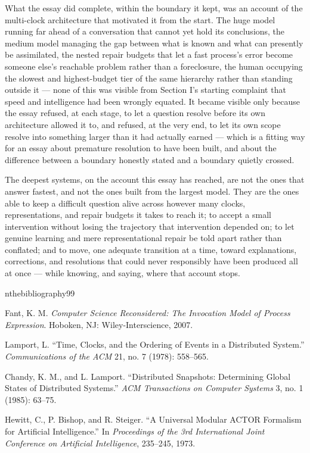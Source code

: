 \documentclass[11pt]{article}
\begin{document}
What the essay did complete, within the boundary it kept, was an account of the multi-clock architecture that motivated it from the start. The huge model running far ahead of a conversation that cannot yet hold its conclusions, the medium model managing the gap between what is known and what can presently be assimilated, the nested repair budgets that let a fast process's error become someone else's reachable problem rather than a foreclosure, the human occupying the slowest and highest-budget tier of the same hierarchy rather than standing outside it --- none of this was visible from Section I's starting complaint that speed and intelligence had been wrongly equated. It became visible only because the essay refused, at each stage, to let a question resolve before its own architecture allowed it to, and refused, at the very end, to let its own scope resolve into something larger than it had actually earned --- which is a fitting way for an essay about premature resolution to have been built, and about the difference between a boundary honestly stated and a boundary quietly crossed.

The deepest systems, on the account this essay has reached, are not the ones that answer fastest, and not the ones built from the largest model. They are the ones able to keep a difficult question alive across however many clocks, representations, and repair budgets it takes to reach it; to accept a small intervention without losing the trajectory that intervention depended on; to let genuine learning and mere representational repair be told apart rather than conflated; and to move, one adequate transition at a time, toward explanations, corrections, and resolutions that could never responsibly have been produced all at once --- while knowing, and saying, where that account stops.


n{thebibliography}{99}

Fant, K. M.
\textit{Computer Science Reconsidered: The Invocation Model of Process Expression}.
Hoboken, NJ: Wiley-Interscience, 2007.

Lamport, L.
``Time, Clocks, and the Ordering of Events in a Distributed System.''
\textit{Communications of the ACM} 21, no. 7 (1978): 558--565.

Chandy, K. M., and L. Lamport.
``Distributed Snapshots: Determining Global States of Distributed Systems.''
\textit{ACM Transactions on Computer Systems} 3, no. 1 (1985): 63--75.

Hewitt, C., P. Bishop, and R. Steiger.
``A Universal Modular ACTOR Formalism for Artificial Intelligence.''
In \textit{Proceedings of the 3rd International Joint Conference on
Artificial Intelligence}, 235--245, 1973.
\end{document}
